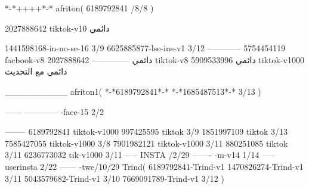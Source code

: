 *-*++++*-*
afriton(
6189792841 /8/8
)

2027888642 tiktok-v10
دائمي

1441598168-in-no-se-16 3/9
6625885877-lse-ins-v1 3/12
------------
5754454119 facbook-v8
دائمي
--------------
2027888642 tiktok-v8
دائمي
5909533996 tiktok-v1000
دائمي مع التحديث

__________
afriton1(
*-*6189792841*-*
*-*1685487513*-* 3/13
)


------
------------
-face-15 2/2

--------
6189792841 tiktok-v1000
997425595 tiktok 3/9
1851997109 tiktok 3/13
7585427055 tiktok-v1000 3/8
7901982121 tiktok-v1000 3/11
880251085 tiktok 3/11
6236773032 tik-v1000 3/11
-----
 INSTA /2/29
-------
-m-v14 1/14
-----
userinsta 2/22
------
-twe/10/29
Trind(
6189792841-Trind-v1 
1470826274-Trind-v1 3/11
5043579682-Trind-v1 3/10
7669091789-Trind-v1 3/12
)

